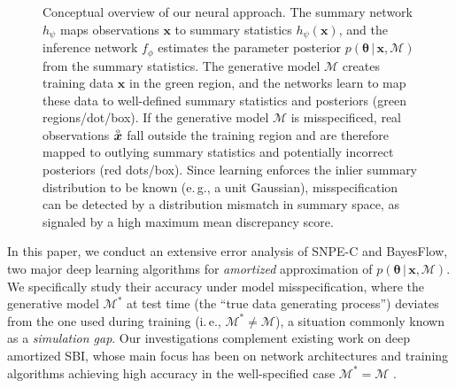 \documentclass[twoside,11pt]{article}
\newcommand{\observed}[1]{\protect\accentset{\text{o}}{#1}}%
\newcommand{\x}{\boldsymbol{x}}
\newcommand{\thetab}{\boldsymbol{\theta}}
\newcommand{\phib}{\boldsymbol{\phi}}
\newcommand{\psib}{\boldsymbol{\psi}}
\newcommand{\0}{\boldsymbol{0}}
\newcommand{\given}{\,|\,}
\newcommand{\M}{\mathcal{M}}
\newcommand{\ie}{i.\,e.}
\newcommand{\eg}{e.\,g.}
\renewcommand{\cite}[1]{\citep{#1}}
\begin{document}
\begin{figure}
    \centering
    \begin{adjustbox}{width=1.0\textwidth}
    
    \end{adjustbox}
    \caption{Conceptual overview of our neural approach.
    The summary network $h_\psi$ maps observations $\x$ to summary statistics $h_\psi(\x)$, and the inference network $f_\phi$ estimates the parameter posterior $p(\thetab\given\x,\mathcal{M})$ from the summary statistics.
    The generative model $\mathcal{M}$ creates training data $\x$ in the green region, and the networks learn to map these data to well-defined summary statistics and posteriors (green regions/dot/box).
    If the generative model $\mathcal{M}$ is misspecificed, real observations $\observed{\x}$ fall outside the training region and are therefore mapped to outlying summary statistics and potentially incorrect posteriors (red dots/box).
    Since learning enforces the inlier summary distribution to be known (\eg, a unit Gaussian), misspecification can be detected by a distribution mismatch in summary space, as signaled by a high maximum mean discrepancy \citep[MMD;][]{Gretton2012} score.}
    \label{fig:conceptual}
\end{figure}

In this paper, we conduct an extensive error analysis of SNPE-C and BayesFlow, two major deep learning algorithms for {\em amortized} approximation of $p(\thetab\given\x,\mathcal{M})$.
We specifically study their accuracy under model misspecification, where the generative model $\mathcal{M}^*$ at test time (the ``true data generating process'') deviates from the one used during training (\ie, $\mathcal{M}^*\ne\mathcal{M}$), a situation commonly known as a {\em simulation gap}. 
Our investigations complement existing work on deep amortized SBI, whose main focus has been on network architectures and training algorithms achieving high accuracy in the well-specified case $\mathcal{M}^*=\mathcal{M}$ \cite{ramesh2022gatsbi, pacchiardi2022likelihood, contrastive, bayesflow, apt, bayes_lstm, papamakarios2016fast}.
\end{document}

